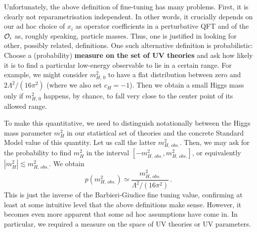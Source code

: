 \documentclass[12pt]{article}
\newcommand{\be}{\begin{equation}}
\newcommand{\ee}{\end{equation}}
\numberwithin{equation}{section}
\begin{document}
Unfortunately, the above definition of fine-tuning has many problems. First, it is clearly not reparametrisation independent. In other words, it crucially depends on our ad hoc choice of $x_i$ as operator coefficients in a perturbative QFT and of the ${\cal O}_i$ as, roughly speaking, particle masses. Thus, one is justified in looking for other, possibly related, definitions. One such alternative definition is probabilistic: Choose a (probability) {\bf measure on the set of UV theories} and ask how likely it is to find a particular low-energy observable to lie in a certain range. For example, we might consider $m_{H,\,0}^2$ to have a flat distribution between zero and $2\Lambda^2/(16\pi^2)$ (where we also set $c_H=-1$). Then we obtain a small Higgs mass only if $m_{H,\,0}^2$ happens, by chance, to fall very close to the center point of its allowed range. 

To make this quantitative, we need to distinguish notationally between the Higgs mass parameter $m_H^2$ in our statistical set of theories and the concrete Standard Model value of this quantity. Let us call the latter $m_{H,\,obs.}^2$. Then, we may ask for the probability to find $m_H^2$ in the interval $[-m_{H,\,obs.}^2,m_{H,\,obs.}^2]$, or equivalently $|m_H^2|\lesssim m_{H,\,obs.}^2$. We obtain
\be
p(m_{H,\,obs.}^2)\simeq \frac{m_{H,\,obs.}^2}{\Lambda^2/(16\pi^2)}\,.
\ee
This is just the inverse of the Barbieri-Giudice fine tuning value, confirming at least at some intuitive level that the above definitions make sense. However, it becomes even more apparent that some ad hoc assumptions have come in. In particular, we required a measure on the space of UV theories or UV parameters.
\end{document}
